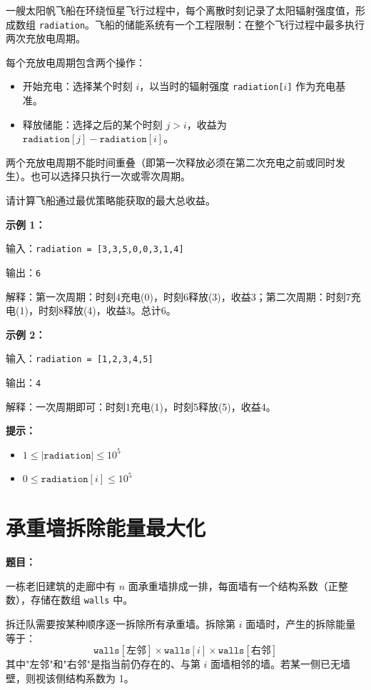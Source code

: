 \documentclass[12pt, a4paper]{article}
\begin{document}
一艘太阳帆飞船在环绕恒星飞行过程中，每个离散时刻记录了太阳辐射强度值，形成数组 \texttt{radiation}。飞船的储能系统有一个工程限制：在整个飞行过程中最多执行两次充放电周期。

每个充放电周期包含两个操作：
\begin{itemize}[leftmargin=2em]
  \item 开始充电：选择某个时刻 $i$，以当时的辐射强度 \texttt{radiation[$i$]} 作为充电基准。
  \item 释放储能：选择之后的某个时刻 $j > i$，收益为 $\texttt{radiation}[j] - \texttt{radiation}[i]$。
\end{itemize}

两个充放电周期不能时间重叠（即第一次释放必须在第二次充电之前或同时发生）。也可以选择只执行一次或零次周期。

请计算飞船通过最优策略能获取的最大总收益。

\textbf{示例 1：}

输入：\texttt{radiation = [3,3,5,0,0,3,1,4]}

输出：\texttt{6}

解释：第一次周期：时刻4充电(0)，时刻6释放(3)，收益3；第二次周期：时刻7充电(1)，时刻8释放(4)，收益3。总计6。

\textbf{示例 2：}

输入：\texttt{radiation = [1,2,3,4,5]}

输出：\texttt{4}

解释：一次周期即可：时刻1充电(1)，时刻5释放(5)，收益4。

\textbf{提示：}
\begin{itemize}[leftmargin=2em]
  \item $1 \leq |\texttt{radiation}| \leq 10^5$
  \item $0 \leq \texttt{radiation}[i] \leq 10^5$
\end{itemize}



\section{承重墙拆除能量最大化}

\noindent\textbf{题目：}

一栋老旧建筑的走廊中有 $n$ 面承重墙排成一排，每面墙有一个结构系数（正整数），存储在数组 \texttt{walls} 中。

拆迁队需要按某种顺序逐一拆除所有承重墙。拆除第 $i$ 面墙时，产生的拆除能量等于：
\[
\texttt{walls}[\text{左邻}] \times \texttt{walls}[i] \times \texttt{walls}[\text{右邻}]
\]
其中"左邻"和"右邻"是指当前仍存在的、与第 $i$ 面墙相邻的墙。若某一侧已无墙壁，则视该侧结构系数为 1。
\end{document}
